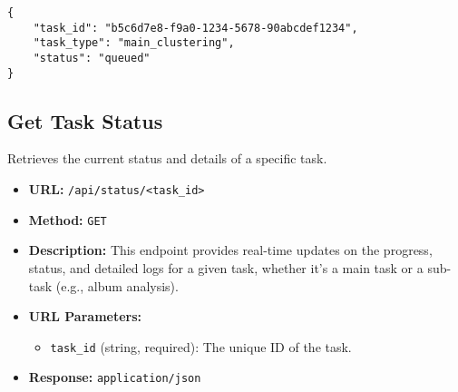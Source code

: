 \documentclass{article}
\begin{document}
\lstset{language=json, caption=Example Response: Start Music Clustering Task}
\begin{lstlisting}
{
    "task_id": "b5c6d7e8-f9a0-1234-5678-90abcdef1234",
    "task_type": "main_clustering",
    "status": "queued"
}
\end{lstlisting}

\subsection{Get Task Status}
Retrieves the current status and details of a specific task.
\begin{itemize}[noitemsep]
    \item \textbf{URL:} \verb|/api/status/<task_id>|
    \item \textbf{Method:} \texttt{GET}
    \item \textbf{Description:} This endpoint provides real-time updates on the progress, status, and detailed logs for a given task, whether it's a main task or a sub-task (e.g., album analysis).
    \item \textbf{URL Parameters:}
    \begin{itemize}[noitemsep]
        \item \texttt{task\_id} (string, required): The unique ID of the task.
    \end{itemize}
    \item \textbf{Response:} \texttt{application/json}
\end{itemize}
\end{document}
